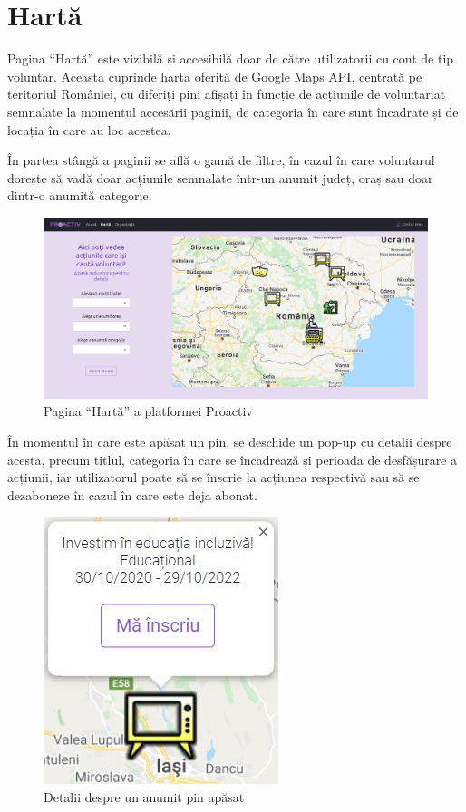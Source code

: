 \documentclass[12pt,a4paper]{report}
\begin{document}
\section{Hartă}
\par
Pagina “Hartă” este vizibilă și accesibilă doar de către utilizatorii cu cont de tip voluntar. Aceasta cuprinde harta oferită de Google Maps API, centrată pe teritoriul României, cu diferiți pini afișați în funcție de acțiunile de voluntariat semnalate la momentul accesării paginii, de categoria în care sunt încadrate și de locația în care au loc acestea.
\\\par
În partea stângă a paginii se află o gamă de filtre, în cazul în care voluntarul dorește să vadă doar acțiunile semnalate într-un anumit județ, oraș sau doar dintr-o anumită categorie.
\\
\begin{figure}[H]
\centering
  \includegraphics[width=1\linewidth]{./imagini/harta.jpg}
  \caption{Pagina “Hartă” a platformei Proactiv}
\end{figure}

\par
În momentul în care este apăsat un pin, se deschide un pop-up cu detalii despre acesta, precum titlul, categoria în care se încadrează și perioada de desfășurare a acțiunii, iar utilizatorul poate să se înscrie la acțiunea respectivă sau să se dezaboneze în cazul în care este deja abonat.
\\
\begin{figure}[H]
\centering
  \includegraphics[width=0.3\linewidth]{./imagini/pin.jpg}
  \caption{Detalii despre un anumit pin apăsat}
\end{figure}
\end{document}
